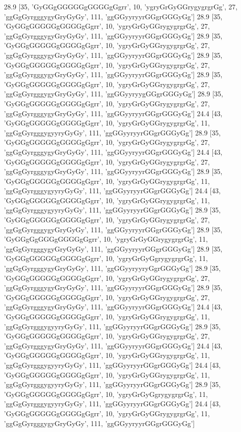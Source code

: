 28.9 [35, 'GyGGgGGGGGgGGGGgGgrr', 10, 'ygryGrGyGGrygygrgrGg', 27, 'ggGgGyrgggygyGryGyGy', 111, 'ggGGyyryyrGGgrGGGyGg']
28.9 [35, 'GyGGgGGGGGgGGGGgGgrr', 10, 'ygryGrGyGGrygygrgrGg', 27, 'ggGgGyrgggygyGryGyGy', 111, 'ggGGyyryyrGGgrGGGyGg']
28.9 [35, 'GyGGgGGGGGgGGGGgGgrr', 10, 'ygryGrGyGGrygygrgrGg', 27, 'ggGgGyrgggygyGryGyGy', 111, 'ggGGyyryyrGGgrGGGyGg']
28.9 [35, 'GyGGgGGGGGgGGGGgGgrr', 10, 'ygryGrGyGGrygygrgrGg', 27, 'ggGgGyrgggygyGryGyGy', 111, 'ggGGyyryyrGGgrGGGyGg']
28.9 [35, 'GyGGgGGGGGgGGGGgGgrr', 10, 'ygryGrGyGGrygygrgrGg', 27, 'ggGgGyrgggygyGryGyGy', 111, 'ggGGyyryygGGgrGGGyGg']
28.9 [35, 'GyGGgGGGGGgGGGGgGgrr', 10, 'ygryGrGyGGrygygrgrGg', 27, 'ggGgGyrgggygyGryGyGy', 111, 'ggGGyyryyrGGgrGGGyGg']
24.4 [43, 'GyGGgGGGGGgGGGGgGgrr', 10, 'ygryGrGyGGrygygrgrGg', 11, 'ggGgGyrgggygyyryGyGy', 111, 'ggGGyyryyrGGgrGGGyGg']
28.9 [35, 'GyGGgGGGGGgGGGGgGgrr', 10, 'ygryGrGyGGrygygrgrGg', 27, 'ggGgGyrgggygyGryGyGy', 111, 'ggGGyyryyrGGgrGGGyGg']
24.4 [43, 'GyGGgGGGGGgGGGGgGgrr', 10, 'ygryGrGyGGrygygrgrGg', 27, 'ggGgGyrgggygyGryGyGy', 111, 'ggGGyyryyrGGgrGGGyGg']
28.9 [35, 'GyGGgGGGGGgGGGGgGgrr', 10, 'ygryGrGyGGrygygrgrGg', 11, 'ggGgGyrgggygyyryGyGy', 111, 'ggGGyyryyrGGgrGGGyGg']
24.4 [43, 'GyGGgGGGGGgGGGGgGgrr', 10, 'ygryGrGyGGrygygrgrGg', 11, 'ggGgGyrgggygyyryGyGy', 111, 'ggGGyyryyrGGgrGGGyGg']
28.9 [35, 'GyGGgGGGGGgGGGGgGgrr', 10, 'ygryGrGyGGrygygrgrGg', 27, 'ggGgGyrgggygyGryGyGy', 111, 'ggGGyyryyrGGgrGGGyGg']
28.9 [35, 'GyGGgGgGGGgGGGGgGgrr', 10, 'ygryGrGyGGrygygrgrGg', 11, 'ggGgGyrgggygyGryGyGy', 111, 'ggGGyyryyrGGgrGGGyGg']
28.9 [35, 'GyGGgGGGGGgGGGGgGgrr', 10, 'ygryGrGyGgrygygrgrGg', 11, 'ggGgGyrgggygyGryGyGy', 111, 'ggGGyyryyryGgrGGGyGg']
28.9 [35, 'GyGGgGGGGGgGGGGgGgrr', 10, 'ygryGrGyGGrygygrgrGg', 27, 'ggGgGyrgggygyGryGyGy', 111, 'ggGGyyryyrGGgrGGGyGg']
28.9 [35, 'GyGGgGGGGGgGGGGgGgrr', 10, 'ygryGrGyGGrygygrgrGg', 27, 'ggGgGyrgggygyGryGyGy', 111, 'ggGGyyryyrGGgrGGGyGg']
24.4 [43, 'GyGGgGGGGGgGGGGgGgrr', 10, 'ygryGrGyGGrygygrgrGg', 11, 'ggGgGyrgggygyyryGyGy', 111, 'ggGGyyryyrGGgrGGGyGg']
28.9 [35, 'GyGGgGGGGGgGGGGgGgrr', 10, 'ygryGrGyGGrygygrgrGg', 27, 'ggGgGyrgggygyGryGyGy', 111, 'ggGGyyryyrGGgrGGGyGg']
24.4 [43, 'GyGGgGGGGGgGGGGgGgrr', 10, 'ygryGrGyGGrygygrgrGg', 11, 'ggGgGyrgggygyyryGyGy', 111, 'ggGGyyryyrGGgrGGGyGg']
24.4 [43, 'GyGGgGGGGGgGGGGgGgrr', 10, 'ygryGrGyGGrygygrgrGg', 11, 'ggGgGyrgggygyyryGyGy', 111, 'ggGGyyryyrGGgrGGGyGg']
28.9 [35, 'GyGGgGGGGGgGGGGgGgrr', 10, 'ygryGrGyGgrygygrgrGg', 11, 'ggGgGyrgggygyyryGyGy', 111, 'ggGGyyryyrGGgrGGGyGg']
24.4 [43, 'GyGGgGGGGGgGGGGgGgrr', 10, 'ygryGrGyGGrygygrgrGg', 11, 'ggGgGyrgggygyGryGyGy', 111, 'ggGGyyryyrGGgrGGGyGg']
